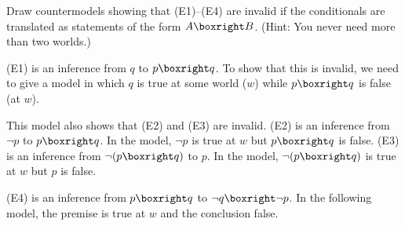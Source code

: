 
\begin{exercise}
  Draw countermodels showing that (E1)--(E4) are invalid if the conditionals are
  translated as statements of the form $A \boxright B$. (Hint: You never need
  more than two worlds.)
\end{exercise}
\begin{solution}
    (E1) is an inference from $q$ to $p \boxright q$. To show that this is invalid, we need to give a model in which $q$ is true at some world ($w$) while $p \boxright q$ is false (at $w$). 
    
  
  This model also shows that (E2) and (E3) are invalid.
  (E2) is an inference from $\neg p$ to $p \boxright q$. In the model,
  $\neg p$ is true at $w$ but $p \boxright q$ is false.
  (E3) is an inference from $\neg(p \boxright q)$ to $p$. In the model,
  $\neg(p \boxright q)$ is true at $w$ but $p$ is false.

  (E4) is an inference from $p \boxright q$ to $\neg q \boxright \neg p$.
  In the following model, the premise is true at $w$ and the conclusion false.
  
\end{solution}

